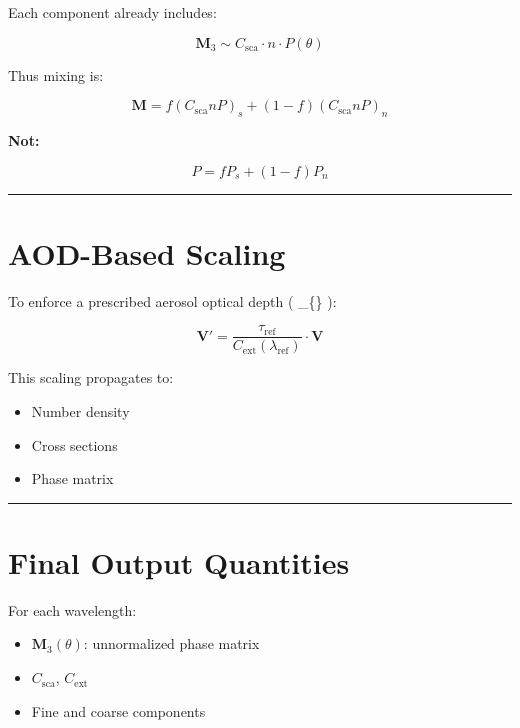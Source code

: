\documentclass[
  letterpaper,
]{scrbook}
\providecommand{\tightlist}{%
  \setlength{\itemsep}{0pt}\setlength{\parskip}{0pt}}
\begin{document}
Each component already includes:

\[
\mathbf{M}_3 \sim C_{\text{sca}} \cdot n \cdot P(\theta)
\]

Thus mixing is:

\[
\mathbf{M}
=
f (C_{\text{sca}} n P)_s
+
(1-f)(C_{\text{sca}} n P)_n
\]

\textbf{Not:}

\[
P = f P_s + (1-f)P_n
\]

\begin{center}\rule{0.5\linewidth}{0.5pt}\end{center}

\section{AOD-Based Scaling}\label{aod-based-scaling}

To enforce a prescribed aerosol optical depth ( \tau\_\{\} ):

\[
\mathbf{V}' = \frac{\tau_{\text{ref}}}{C_{\text{ext}}(\lambda_{\text{ref}})} \cdot \mathbf{V}
\]

This scaling propagates to:

\begin{itemize}
\tightlist
\item
  Number density\\
\item
  Cross sections\\
\item
  Phase matrix
\end{itemize}

\begin{center}\rule{0.5\linewidth}{0.5pt}\end{center}

\section{Final Output Quantities}\label{final-output-quantities}

For each wavelength:

\begin{itemize}
\tightlist
\item
  \(\mathbf{M}_3(\theta)\): unnormalized phase matrix\\
\item
  \(C_{\text{sca}}\), \(C_{\text{ext}}\)\\
\item
  Fine and coarse components
\end{itemize}
\end{document}
